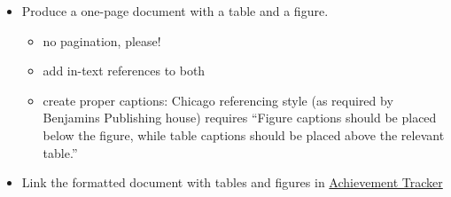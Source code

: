 \documentclass[a4paper,11pt]{article}
\begin{document}
\begin{tcolorbox}[width=\textwidth, colback={yellow!40!white}, title={}, colbacktitle=yellow!60!white, coltitle=black]
	\begin{itemize}
		\item Produce a one-page document with a table and a figure. 
		\begin{itemize}
			\item no pagination, please!
			\item add in-text references to both
			\item create proper captions: Chicago referencing style (as required by Benjamins Publishing house) requires ``Figure captions should be placed below the figure, while table captions should be placed above the relevant table.'' 
		\end{itemize} 
		\item Link the formatted document with tables and figures in  \href{https://docs.google.com/document/d/17ZBAQGBKIlO6JMwxz3LlghYq1sdsUjhHVXga46BK0kg/edit?usp=sharing}{Achievement Tracker}
	\end{itemize}
	
\end{tcolorbox}%
\end{document}
